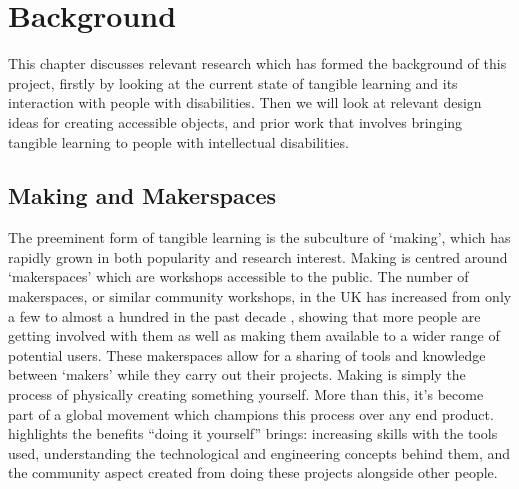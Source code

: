 \documentclass{l4proj}
\begin{document}

\chapter{Background}
\label{background}
This chapter discusses relevant research which has formed the background of this project, firstly by looking at the current state of tangible learning and its interaction with people with disabilities. Then we will look at relevant design ideas for creating accessible objects, and prior work that involves bringing tangible learning to people with intellectual disabilities. 

\section{Making and Makerspaces}
The preeminent form of tangible learning is the subculture of ‘making’, which has rapidly grown in both popularity and research interest. Making is centred around ‘makerspaces’ which are workshops accessible to the public. The number of makerspaces, or similar community workshops, in the UK has increased from only a few to almost a hundred in the past decade \citep{Sle2015}, showing that more people are getting involved with them as well as making them available to a wider range of potential users. These makerspaces allow for a sharing of tools and knowledge between ‘makers’ while they carry out their projects. Making is simply the process of physically creating something yourself. More than this, it’s become part of a global movement which champions this process over any end product. \cite{Kuz2010} highlights the benefits “doing it yourself” brings: increasing skills with the tools used, understanding the technological and engineering concepts behind them, and the community aspect created from doing these projects alongside other people.
\end{document}

